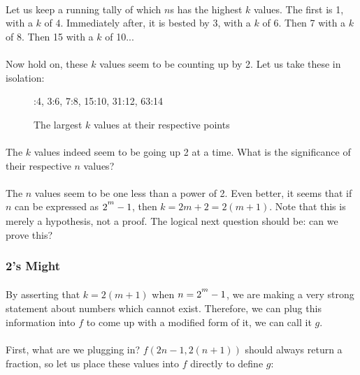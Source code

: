 \documentclass[12pt,letterpaper]{article}
\begin{document}
			\paragraph{} Let us keep a running tally of which $n$s has the highest $k$ values. The first is 1, with a $k$ of 4. Immediately after, it is bested by 3, with a $k$ of 6. Then 7 with a $k$ of 8. Then 15 with a $k$ of 10...
			
			\paragraph{} Now hold on, these $k$ values seem to be counting up by 2. Let us take these in isolation:
			
			\begin{figure}[h]
				:4, 3:6, 7:8, 15:10, 31:12, 63:14
				
				\caption{The largest $k$ values at their respective points}
			\end{figure}
		
			
			\paragraph{} The $k$ values indeed seem to be going up 2 at a time. What is the significance of their respective $n$ values?
			
			\paragraph{} The $n$ values seem to be one less than a power of 2. Even better, it seems that if $n$ can be expressed as $2\strut^m - 1$, then $k = 2m + 2 = 2(m + 1)$. Note that this is merely a hypothesis, not a proof. The logical next question should be: can we prove this?
			
		\subsubsection{2's Might}
			
			\paragraph{} By asserting that $k = 2(m + 1)$ when $n = 2\strut^m - 1$, we are making a very strong statement about numbers which cannot exist. Therefore, we can plug this information into $f$ to come up with a modified form of it, we can call it $g$.
			
			\paragraph{} First, what are we plugging in? $f(2n-1, 2(n + 1))$ should always return a fraction, so let us place these values into $f$ directly to define $g$:
			
\end{document}
